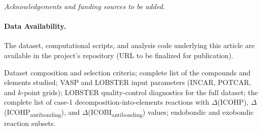 \documentclass[journal=jpccck,manuscript=article]{achemso}
\begin{document}
\begin{acknowledgement}
\textit{Acknowledgements and funding sources to be added.}
\end{acknowledgement}

\paragraph{Data Availability.} The dataset, computational scripts, and
analysis code underlying this article are available in the project's
repository (URL to be finalized for publication).

\begin{suppinfo}
Dataset composition and selection criteria; complete list of the compounds
and elements studied; VASP and LOBSTER input parameters (INCAR, POTCAR, and
$k$-point grids); LOBSTER quality-control diagnostics for the full dataset;
the complete list of case-1
decomposition-into-elements reactions with $\Delta$(ICOHP),
$\Delta$(ICOHP\textsubscript{antibonding}), and
$\Delta$(ICOBI\textsubscript{antibonding}) values; endobondic and exobondic
reaction subsets.
\end{suppinfo}


\end{document}
